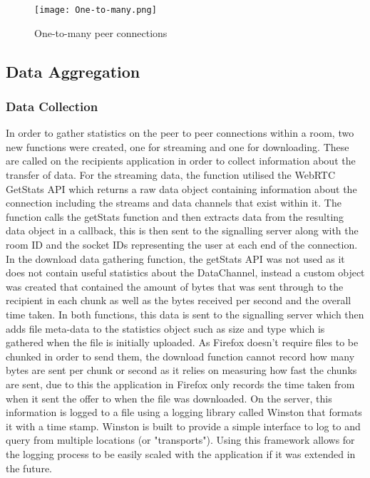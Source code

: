 \documentclass[]{report}
\begin{document}
			\begin{figure}[H]
				\caption{One-to-many peer connections}
				\centering
				\texttt{[image: One-to-many.png]}
			\end{figure}	
			
			\subsection{Data Aggregation}
				\subsubsection{Data Collection}
				In order to gather statistics on the peer to peer connections within a room, two new functions were created, one for streaming and one for downloading. These are called on the recipients application in order to collect information about the transfer of data. For the streaming data, the function utilised the WebRTC GetStats API \cite{getStats} which returns a raw data object containing information about the connection including the streams and data channels that exist within it. The function calls the getStats function and then extracts data from the resulting data object in a callback, this is then sent to the signalling server along with the room ID and the socket IDs representing the user at each end of the connection. In the download data gathering function, the getStats API was not used as it does not contain useful statistics about the DataChannel, instead a custom object was created that contained the amount of bytes that was sent through to the recipient in each chunk as well as the bytes received per second and the overall time taken. In both functions, this data is sent to the signalling server which then adds file meta-data to the statistics object such as size and type which is gathered when the file is initially uploaded. As Firefox doesn't require files to be chunked in order to send them, the download function cannot record how many bytes are sent per chunk or second as it relies on measuring how fast the chunks are sent, due to this the application in Firefox only records the time taken from when it sent the offer to when the file was downloaded. On the server, this information is logged to a file using a logging library called Winston that formats it with a time stamp. Winston is built to provide a simple interface to log to and query from multiple locations (or "transports"). Using this framework allows for the logging process to be easily scaled with the application if it was extended in the future.
				
\end{document}
